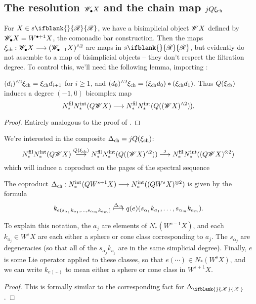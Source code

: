 \documentclass[10pt]{article}
\newcommand{\PRLie}[1]%
{\ifblank{#1}{\scrR}{\scrR^{#1}}}
\newcommand{\LL}[1]{\ifblank{#1}{\scrK}{\scrK^{#1}}}
\renewcommand{\Q}{Q}
\begin{document}
\begin{Grothendieck Multiplicativity}
\subsection{The resolution $\scrW_\bullet X$ and the chain map $j\circ Q\xi_\textup{ch}$}
For $X\in s\PRLie{}$, we have a bisimplicial object $\scrW X$ defined by $\scrW_\bullet X=W^{\bullet+1} X$, the comonadic bar construction. Then the maps $\xi_\textup{ch}:\scrW_\bullet X\to (\scrW_{\bullet-1} X)^{\wedge 2}$ are maps in $s\PRLie{}$, but evidently do not assemble to a map of bisimplicial objects -- they don't respect the filtration degree. To control this, we'll need the following lemma, importing \cite[lemma 5.5]{MR1089001}:
\begin{lem}
$(d_i)^{\wedge 2}\xi_\textup{ch}=\xi_\textup{ch}d_{i+1}$ for $i\geq1$, and $(d_0)^{\wedge 2}\xi_\textup{ch}= (\xi_\textup{ch}d_{0})*(\xi_\textup{ch}d_{1})$. Thus $\Q(\xi_\textup{ch})$ induces a degree $(-1,0)$ bicomplex map 
\[N_*^\textup{fil}N_*^\textup{int}(\Q\scrW X)\to N_*^\textup{fil}N_*^\textup{int}(\Q((\scrW X)^{\wedge 2})).\]
\end{lem}
\begin{proof}
Entirely analogous to the proof of \cite[lemma 5.5]{MR1089001}.
\end{proof}
We're interested in the composite $\Delta_\textup{ch}=j\circ Q(\xi_\textup{ch})$:
\[N_*^\textup{fil}N_*^\textup{int}(\Q\scrW X)\overset{\Q(\xi_\textup{ch})}{\to} N_*^\textup{fil}N_*^\textup{int}(\Q((\scrW X)^{\wedge 2}))\overset{j}{\to} N_*^\textup{fil}N_*^\textup{int}((\Q\scrW X)^{\otimes 2})\]
which will induce a coproduct on the pages of the spectral sequence
\begin{prop}
The coproduct $\Delta_\textup{ch}:N_*^\textup{int}(QW^{s+1}X)\to N_*^\textup{int}((QW^{s}X)^{\otimes2})$ is given by the formula
\[k_{e(s_{\alpha_1}k_{a_1},\ldots,s_{\alpha_m}k_{a_m})}\overset{\Delta_\textup{ch}}{\mapsto}q(e)(s_{\alpha_1}k_{a_1},\ldots,s_{\alpha_m}k_{a_m}).\]
\end{prop}
To explain this notation, the $a_j$ are elements of $N_*(W^{s-1}X)$, and each $k_{a_j}\in W^sX$ are each either a sphere or cone class corresponding to $a_j$. The $s_{\alpha_j}$ are degeneracies (so that all of the $s_{\alpha_j}k_{a_j}$ are in the same simplicial degree). Finally, $e$ is some Lie operator applied to these classes, so that $e(\cdots )\in N_*(W^sX)$, and we can write $k_{e(\cdots )}$ to mean either a sphere or cone class in $W^{s+1}X$.
\begin{proof}
This is formally similar to the corresponding fact for $\Delta_{\LL{}}$.
\end{proof}

\end{Grothendieck Multiplicativity}
\end{document}
